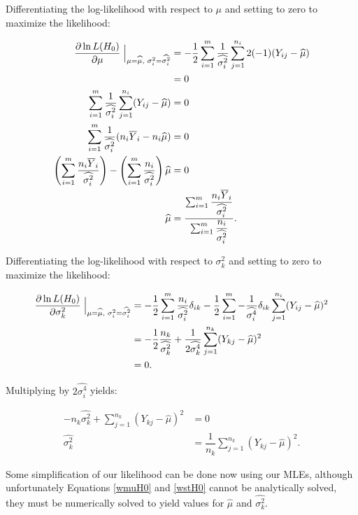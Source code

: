 \documentclass[12pt,a4paper]{article}
\newcommand{\ovY}{\overline{Y}}
\newcommand{\wmu}{\widehat{\mu}}
\newcommand{\wst}[1]{\widehat{\sigma^2_{#1}}}
\newcommand{\wstq}[1]{\widehat{\sigma^4_{#1}}}
\begin{document}
	Differentiating the log-likelihood with respect to $\mu$ and setting to zero to maximize the likelihood:
	
	\begin{align}
		\dfrac{\partial \ln{L(H_0)}}{\partial \mu} \Bigm\lvert_{\mu = \wmu, \hspace{0.1cm}\sigma^2_i = \wst{i}} &= -\dfrac{1}{2} \sum_{i=1}^m \dfrac{1}{\wst{i}}\sum_{j=1}^{n_i} 2(-1)(Y_{ij}-\wmu) \nonumber\\
		&= 0 \nonumber\\
		\sum_{i=1}^m \dfrac{1}{\wst{i}}\sum_{j=1}^{n_i} (Y_{ij}-\wmu) &= 0 \nonumber\\
		\sum_{i=1}^m \dfrac{1}{\wst{i}} (n_i\ovY_i - n_i \wmu) &= 0 \nonumber\\
		\left(\sum_{i=1}^m \dfrac{n_i \ovY_i}{\wst{i}}\right) - \left(\sum_{i=1}^m \dfrac{n_i}{\wst{i}}\right)\wmu &= 0 \nonumber \\
		\wmu &= \dfrac{\sum_{i=1}^m \dfrac{n_i \ovY_i}{\wst{i}}}{\sum_{i=1}^m \dfrac{n_i}{\wst{i}}}. \label{wmuH0}
	\end{align}

	Differentiating the log-likelihood with respect to $\sigma^2_k$ and setting to zero to maximize the likelihood:
	
	\begin{align*}
		\dfrac{\partial \ln{L(H_0)}}{\partial \sigma^2_k} \Bigm\lvert_{\mu = \wmu, \hspace{0.1cm} \sigma^2_i = \wst{i}} &= -\dfrac{1}{2} \sum_{i=1}^m \dfrac{n_i}{\wst{i}}\delta_{ik} - \dfrac{1}{2} \sum_{i=1}^m -\dfrac{1}{\wstq{i}} \delta_{ik}\sum_{j=1}^{n_i} (Y_{ij}-\wmu)^2 \\
		&= -\dfrac{1}{2} \dfrac{n_k}{\wst{k}} + \dfrac{1}{2\wstq{k}} \sum_{j=1}^{n_k} (Y_{kj}-\wmu)^2 \\
		&= 0.
	\end{align*}

	Multiplying by $2\wstq{i}$ yields:
	
	\begin{align}
		-n_k\wst{k} + \sum_{j=1}^{n_k} (Y_{kj}-\wmu)^2 &= 0 \nonumber\\
		\wst{k} &= \dfrac{1}{n_k} \sum_{j=1}^{n_k} (Y_{kj}-\wmu)^2. \label{wstH0}
	\end{align}

	Some simplification of our likelihood can be done now using our MLEs, although unfortunately Equations \ref{wmuH0} and \ref{wstH0} cannot be analytically solved, they must be numerically solved to yield values for $\wmu$ and $\wst{k}$.  
	
\end{document}
